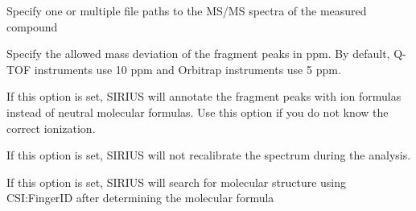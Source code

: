 \documentclass[letterpaper,10pt,openany,oneside]{sphinxmanual}
\begin{document}

\begin{fulllineitems}
\label{commandline:cmdoption-2}
Specify one or multiple file paths to the MS/MS spectra of the measured compound

\end{fulllineitems}


\begin{fulllineitems}
\label{commandline:cmdoption--ppm-max}
Specify the allowed mass deviation of the fragment peaks in ppm. By default, Q-TOF instruments use 10 ppm and Orbitrap instruments use 5 ppm.

\end{fulllineitems}


\begin{fulllineitems}
\label{commandline:cmdoption--auto-charge}
If this option is set, SIRIUS will annotate the fragment peaks with ion formulas instead of neutral molecular formulas. Use this option if you do not know the correct ionization.

\end{fulllineitems}


\begin{fulllineitems}
\label{commandline:cmdoption--no-recalibrate}
If this option is set, SIRIUS will not recalibrate the spectrum during the analysis.

\end{fulllineitems}


\begin{fulllineitems}
\label{commandline:cmdoption--fingerid}
If this option is set, SIRIUS will search for molecular structure using CSI:FingerID after determining the molecular formula

\end{fulllineitems}
\end{document}

